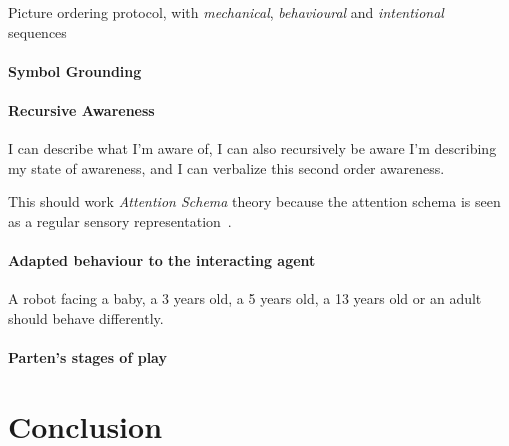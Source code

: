 \documentclass[a4paper]{article}
\begin{document}
Picture ordering protocol, with \emph{mechanical}, \emph{behavioural} and
\emph{intentional} sequences~\cite{baron1986mechanical}

\paragraph{Symbol Grounding}

\paragraph{Recursive Awareness}

I can describe what I'm aware of, I can also recursively be aware I'm describing
my state of awareness, and I can verbalize this second order awareness.

This should work \emph{Attention Schema} theory because the attention schema
is seen as a regular sensory
representation~\citep[p.55]{graziano2013consciousness}.

\paragraph{Adapted behaviour to the interacting agent}

A robot facing a baby, a 3 years old, a 5 years old, a 13 years old or an adult
should behave differently.


\paragraph{Parten's stages of play}


\section{Conclusion}



\end{document}
